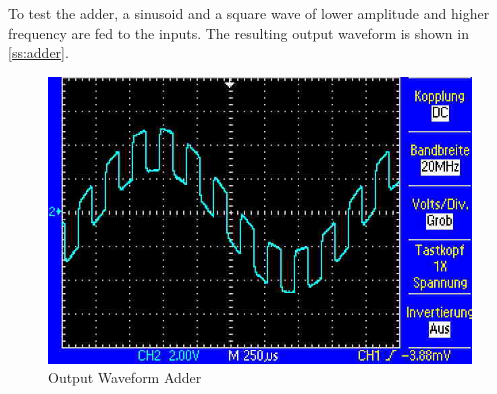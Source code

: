 To test the adder, a sinusoid and a square wave of lower amplitude and higher frequency are fed to the inputs.
The resulting output waveform is shown in \autoref{ss:adder}.

\begin{figure}
	\centering
	\includegraphics[width=.4\linewidth]{./img/ss-adder}
	\caption{Output Waveform Adder}
	\label{ss:adder}
\end{figure}
